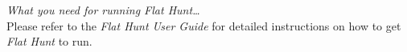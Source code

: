 \emph{What you need for running \emph{Flat Hunt}\ldots}\\

\noindent Please refer to the \emph{Flat Hunt User Guide} for detailed instructions on how to get \emph{Flat Hunt} to run.
\pagebreak
